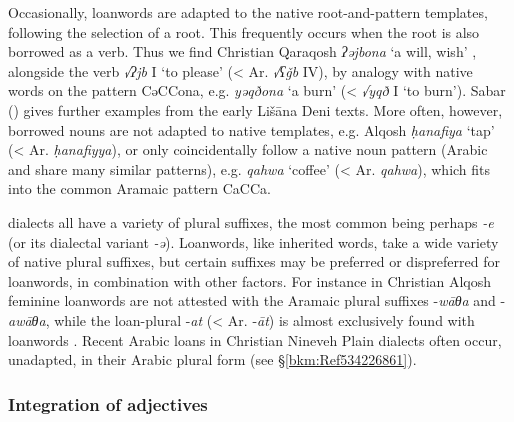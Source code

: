 \documentclass[output=paper]{langsci/langscibook}
\begin{document}
Occasionally, {loanwords} are adapted to the native {root-and-pattern} templates, following the selection of a {root}. This frequently occurs when the {root} is also borrowed as a verb. Thus we find Christian Qaraqosh \textit{ʔəjbona} ‘a will, wish’ \citep[517]{Khan2002}, alongside the verb \textit{√ʔjb} I ‘to please’ (< Ar. \textit{√ʕǧb} IV), by {analogy} with native words on the pattern CəCCona, e.g. \textit{yəqðona} ‘a burn’ (< \textit{√yqð} I ‘to burn’). Sabar (\citeyear[205]{Sabar1984}) gives further examples from the early Lišāna Deni texts. More often, however, borrowed nouns are not adapted to native templates, e.g. Alqosh \textit{ḥanafiya} ‘tap’ (< Ar. \textit{ḥanafiyya}), or only coincidentally follow a native noun pattern (Arabic and  share many similar patterns), e.g. \textit{qahwa} ‘coffee’ (< Ar. \textit{qahwa}), which fits into the common Aramaic pattern CaCCa.

 dialects all have a variety of plural suffixes, the most common being perhaps \textit{\nobreakdash-e} (or its dialectal variant \textit{\nobreakdash-ə}). Loanwords, like inherited words, take a wide variety of native plural suffixes, but certain suffixes may be preferred or dispreferred for {loanwords}, in combination with other factors. For instance in Christian Alqosh feminine {loanwords} are not attested with the Aramaic plural suffixes \nobreakdash-\textit{wāθa} and \nobreakdash-\textit{awāθa}, while the loan-plural \nobreakdash-\textit{at} (< Ar. \nobreakdash-\textit{āt}) is almost exclusively found with {loanwords} \citep[347]{Coghill2005}. Recent Arabic loans in Christian Nineveh Plain dialects often occur, unadapted, in their Arabic plural form (see §\ref{bkm:Ref534226861}).

\subsubsection{Integration of adjectives}
\end{document}
